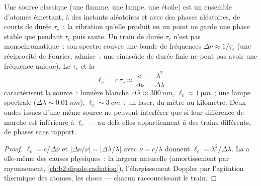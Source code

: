 \begin{proposition}\label{prop:b2:scalar-light-model:coherence}
Une source classique (une flamme, une lampe, une étoile) est un ensemble d'atomes
émettant, à des instants aléatoires et avec des phases aléatoires, de courts
\emph{} de durée $\tau_c$~: la vibration qu'elle produit en un
point ne garde une phase stable que pendant $\tau_c$ puis saute. Un train de
durée $\tau_c$ n'est pas monochromatique~: son spectre couvre une bande de
fréquences $\Delta\nu \approx 1/\tau_c$ (une réciprocité de Fourier, admise~: une
sinusoïde de durée finie ne peut pas avoir une fréquence unique). Le \emph{}
$\tau_c$ et la \emph{}
\[
\ell_c = c\,\tau_c \approx \frac c{\Delta\nu} = \frac{\lambda^2}{\Delta\lambda}
\]
caractérisent la source~: lumière blanche $\Delta\lambda \approx \qty{300}{nm}$, $\ell_c
\approx \qty{1}{\micro m}$~; une lampe spectrale ($\Delta\lambda \sim \qty{0.01}{nm}$), $\ell_c \sim
\qty{3}{cm}$~; un laser, du mètre au kilomètre. Deux ondes issues d'une
même source ne peuvent interférer que si leur différence de marche est inférieure
à $\ell_c$ --- au-delà elles appartiennent à des trains différents, de phases
sans rapport.
\end{proposition}

\begin{proof}
$\ell_c = c/\Delta\nu$ et $|\Delta\nu/\nu| = |\Delta\lambda/\lambda|$ avec $\nu = c/\lambda$ donnent $\ell_c =
\lambda^2/\Delta\lambda$. La  a elle-même des causes physiques~: la
largeur naturelle (amortissement par rayonnement, \cref{ch:b2:dipole-radiation}),
l'élargissement Doppler par l'agitation thermique des atomes, les chocs --- chacun
raccourcissant le train.
\end{proof}

